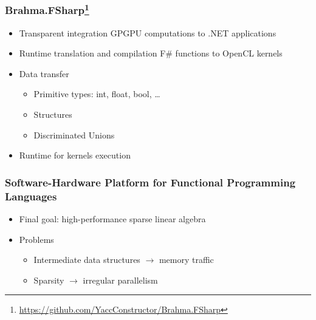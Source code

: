\documentclass[xcolor=table,aspectratio=169]{beamer}
\begin{document}
\begin{frame}[fragile]
  \frametitle{Brahma.FSharp\footnote{\href{https://github.com/YaccConstructor/Brahma.FSharp}{https://github.com/YaccConstructor/Brahma.FSharp}}}
  \begin{itemize}
    \item Transparent integration GPGPU computations to .NET applications
    \pause
    \item Runtime translation and compilation F\# functions to OpenCL kernels
    \item Data transfer
    \begin{itemize}
      \item Primitive types: int, float, bool, \ldots
      \item Structures
      \item Discriminated Unions
    \end{itemize}
    \item Runtime for kernels execution
  \end{itemize}
 
\end{frame}

\begin{frame}[fragile]
  \frametitle{Software-Hardware Platform for Functional Programming Languages}  
  \begin{itemize}
  \item Final goal: high-performance sparse linear algebra  
  \item Problems 
  \begin{itemize}
    \item Intermediate data structures $\to$ memory traffic
    \item Sparsity $\to$ irregular parallelism 
  \end{itemize}
  \end{itemize}
\end{frame}
\end{document}
